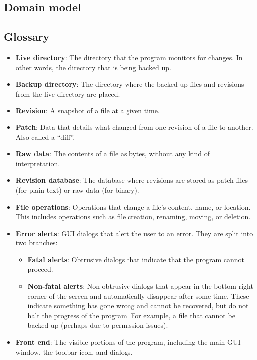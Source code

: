 \documentclass[12pt,a4paper]{article}
\newcommand\todonote[1]{{\color{red}\fbox{\parbox{\dimexpr\linewidth-2\fboxsep-2\fboxrule}{\textit\large{\textbf{TODO: #1}}}}}}
\begin{document}
\subsection{Domain model}
\todonote{Butler. Make from scratch.}

\subsection{Glossary}
\begin{itemize}
\item \textbf{Live directory}: The directory that the program monitors for changes. In other words, the directory that is being backed up.
\item \textbf{Backup directory}: The directory where the backed up files and revisions from the live directory are placed.
\item \textbf{Revision}: A snapshot of a file at a given time.
\item \textbf{Patch}: Data that details what changed from one revision of a file to another. Also called a ``diff''.
\item \textbf{Raw data}: The contents of a file as bytes, without any kind of interpretation.
\item \textbf{Revision database}: The database where revisions are stored as patch files (for plain text) or raw data (for binary).
\item \textbf{File operations}: Operations that change a file's content, name, or location. This includes operations such as file creation, renaming, moving, or deletion.
\item \textbf{Error alerts}: GUI dialogs that alert the user to an error. They are split into two branches:
	\begin{itemize}
	\item \textbf{Fatal alerts}: Obtrusive dialogs that indicate that the program cannot proceed.
	\item \textbf{Non-fatal alerts}: Non-obtrusive dialogs that appear in the bottom right corner of the screen and automatically disappear after some time. These indicate something has gone wrong and cannot be recovered, but do not halt the progress of the program. For example, a file that cannot be backed up (perhaps due to permission issues).
	\end{itemize}
\item \textbf{Front end}: The visible portions of the program, including the main GUI window, the toolbar icon, and dialogs.
	\begin{itemize}

\end{itemize}
\end{itemize}
\end{document}
